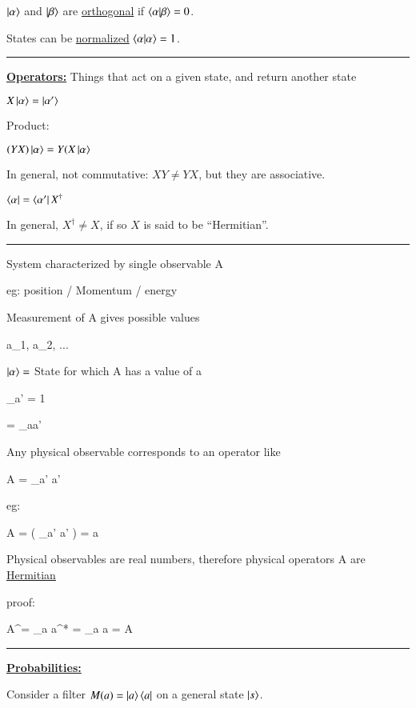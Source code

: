 {$\ket{\alpha}$ and $\ket{\beta}$ are \underline{orthogonal} if $\braket{\alpha|\beta} = 0$.

States can be \underline{normalized} $\braket{\alpha|\alpha} = 1$.

\noindent\rule{\textwidth}{1pt}

\textbf{\underline{Operators:}} Things that act on a given state, and return another state

$X\ket{\alpha} = \ket{\alpha'}$

Product:

$(YX)\ket{\alpha} = Y(X\ket{\alpha}$

In general, not commutative:  $XY \neq YX$, but they are associative.


$\bra{\alpha} = \bra{\alpha'}X^\dagger$

In general, $X^\dagger \neq X$,  if so $X$ is said to be ``Hermitian''.

\noindent\rule{\textwidth}{1pt}

System characterized by single observable A

eg: position / Momentum / energy

Measurement of A gives possible values

\be
a_1, a_2, ...
\ee

$\ket{\alpha} = $  State for which A has a value of a

\be
\sum\limits_{a'}  = 1 
\ee

\be
{} = \delta_{aa'}
\ee

Any physical observable corresponds to an operator like

\be
A = \sum\limits_{a'} a'   
\ee

eg: 


\be
A\ket{\alpha} = \left( \sum\limits_{a'} a'  \right)\ket{\alpha} = a \ket{\alpha}
\ee

Physical observables are real numbers, therefore physical operators A are \underline{Hermitian}

proof:

\be
A^\dagger = \sum\limits_{a} a^* \ket{\alpha}\bra{\alpha} = \sum\limits_{a} a \ket{\alpha}\bra{\alpha} = A
\ee

\noindent\rule{\textwidth}{1pt}

\textbf{\underline{Probabilities:}}

Consider a filter $M(a) = \ket{a}\bra{a}$ on a general state $\ket{s}$.

}
